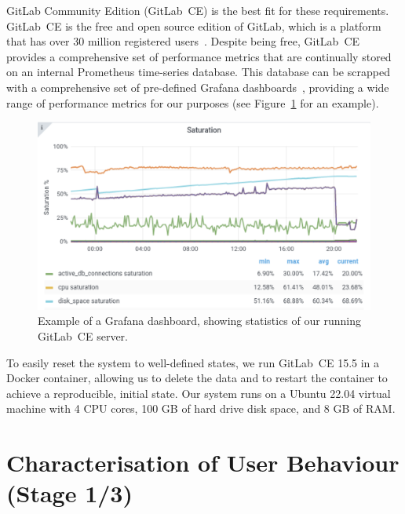 \documentclass[dvipsnames,format=sigconf,anonymous=False,review=false, balance=false]{acmart}
\begin{document}
GitLab Community Edition (GitLab~CE) is the best fit for these requirements. 
GitLab~CE is the free and open source edition of GitLab, which is a platform that has over 30 million registered users~\cite{gitlabusers}. 
Despite being free, GitLab~CE provides a comprehensive set of performance metrics that are continually stored on an internal Prometheus time-series database. This database can be scrapped with a comprehensive set of pre-defined Grafana dashboards~\cite{gitlabdocumentation}, providing a wide range of performance metrics for our purposes (see Figure~\ref{fig:grafana} for an example).

\begin{figure}
\centering
\includegraphics[width=\linewidth,trim=0 0 0 0,clip]{grafana.png}\vspace{-1mm}
\caption{Example of a Grafana dashboard, showing statistics of our running GitLab~CE server.}
\label{fig:grafana}
\end{figure}

To easily reset the system to well-defined states, we run GitLab~CE 15.5 in a Docker container, allowing us to delete the data and to restart the container to achieve a reproducible, initial state. Our system runs on a Ubuntu 22.04 virtual machine with 4 CPU cores, 100 GB of hard drive disk space, and 8 GB of RAM. 

\section{Characterisation of User Behaviour (Stage 1/3)}
\end{document}
